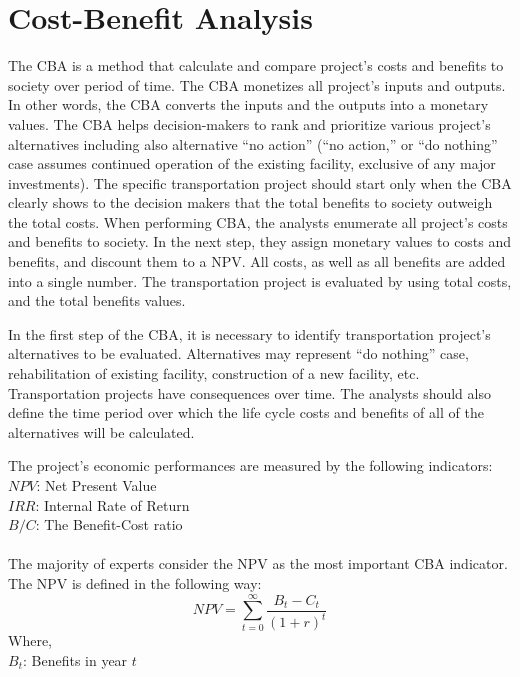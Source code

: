 \section{Cost-Benefit Analysis}
The CBA is a method that calculate and compare project’s costs and benefits to society over period of time. The CBA monetizes all project’s inputs and outputs. In other words, the CBA converts the inputs and the outputs into a monetary values. The CBA helps decision-makers to rank and prioritize various project’s alternatives including also alternative “no action” (“no action,” or “do nothing” case assumes continued operation of the existing facility, exclusive of any major investments). The specific transportation project should start only when the CBA clearly shows to the decision makers that the total benefits to society outweigh the total costs. When performing CBA, the analysts enumerate all project’s costs and benefits to society. In the next step, they assign monetary values to costs and benefits, and discount them to a NPV. All costs, as well as all benefits are added into a single number. The transportation project is evaluated by using total costs, and the total benefits values.\\
\par
In the first step of the CBA, it is necessary to identify transportation project’s alternatives to be
evaluated. Alternatives may represent “do nothing” case, rehabilitation of existing facility, construction of a new facility, etc. Transportation projects have consequences over time. The analysts should also define the time period over which the life cycle costs and benefits of all of the alternatives will be calculated.\\
\par
The project’s economic performances are measured by the following indicators:\\
$NPV$: Net Present Value\\
$IRR$: Internal Rate of Return\\
$B/C$: The Benefit-Cost ratio\\\\
The majority of experts consider the NPV as the most important CBA indicator. The NPV is defined in the following way:
\begin{equation}
	NPV = \sum_{t = 0}^{\infty} \frac{B_t - C_t}{(1 + r)^t}
\end{equation}
Where,\\
\hspace*{10mm}$B_t$: Benefits in year $t$\\
